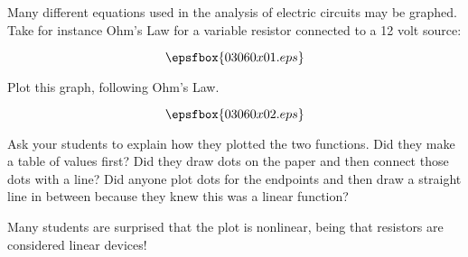 

Many different equations used in the analysis of electric circuits may be graphed.  Take for instance Ohm's Law for a variable resistor connected to a 12 volt source:

$$\epsfbox{03060x01.eps}$$

Plot this graph, following Ohm's Law.







$$\epsfbox{03060x02.eps}$$







Ask your students to explain how they plotted the two functions.  Did they make a table of values first?  Did they draw dots on the paper and then connect those dots with a line?  Did anyone plot dots for the endpoints and then draw a straight line in between because they knew this was a linear function?

Many students are surprised that the plot is nonlinear, being that resistors are considered linear devices!





